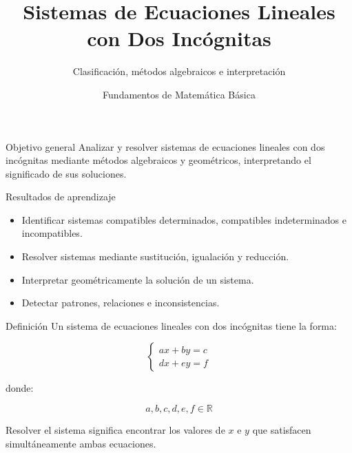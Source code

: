 \documentclass[aspectratio=169]{beamer}
\title[Sistemas de ecuaciones lineales]{Sistemas de Ecuaciones Lineales con Dos Incógnitas}
\subtitle{Clasificación, métodos algebraicos e interpretación}
\author{Fundamentos de Matemática Básica}
\institute{Universidad Santo Tomás}
\date{}
\begin{document}
	
	\begin{frame}
		\titlepage
	\end{frame}
	
	\begin{frame}{Objetivo general}
		Analizar y resolver sistemas de ecuaciones lineales con dos incógnitas mediante métodos algebraicos y geométricos, interpretando el significado de sus soluciones.
		
		\bigskip
		
		\begin{block}{Resultados de aprendizaje}
			\begin{itemize}
				\item Identificar sistemas compatibles determinados, compatibles indeterminados e incompatibles.
				\item Resolver sistemas mediante sustitución, igualación y reducción.
				\item Interpretar geométricamente la solución de un sistema.
				\item Detectar patrones, relaciones e inconsistencias.
			\end{itemize}
		\end{block}
	\end{frame}
	
	\begin{frame}{Definición}
		Un sistema de ecuaciones lineales con dos incógnitas tiene la forma:
		
		\[
		\begin{cases}
			ax+by=c\\
			dx+ey=f
		\end{cases}
		\]
		
		donde:
		
		\[
		a,b,c,d,e,f\in\mathbb{R}
		\]
		
		\bigskip
		
		Resolver el sistema significa encontrar los valores de \(x\) e \(y\) que satisfacen simultáneamente ambas ecuaciones.
	\end{frame}
	
\end{document}
